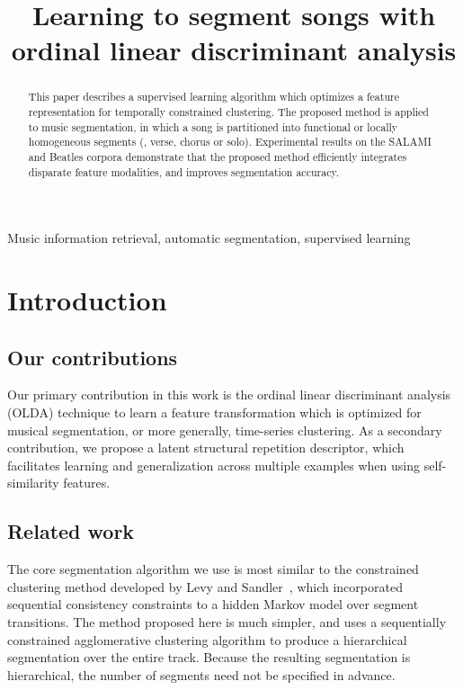 \documentclass{article}
\title{Learning to segment songs with ordinal linear discriminant analysis}
\begin{document}
%
\maketitle
%
\begin{abstract}
This paper describes a supervised learning algorithm which optimizes a feature representation for temporally constrained clustering. 
The proposed method is applied to music segmentation, in which a song is partitioned into functional or
locally homogeneous segments (\eg, verse, chorus or solo).  Experimental results on the SALAMI and Beatles corpora demonstrate
that the proposed method efficiently integrates disparate feature modalities, and improves segmentation accuracy.
\end{abstract}
%
\begin{keywords}
Music information retrieval, automatic segmentation, supervised learning
\end{keywords}
%
\section{Introduction}
\label{sec:intro}

\subsection{Our contributions}
Our primary contribution in this work is the ordinal linear discriminant analysis (OLDA) technique to learn a 
feature transformation which is optimized for musical segmentation, or more generally, time-series clustering.
As a secondary contribution, we propose a latent structural repetition descriptor, which facilitates learning and
generalization across multiple examples when using self-similarity features.

\subsection{Related work}
\label{sec:related}

The core segmentation algorithm we use is most similar to the constrained clustering method developed by Levy and
Sandler~\cite{levy2008structural}, which incorporated sequential consistency constraints to a hidden Markov model over
segment transitions. The method proposed here is much simpler, and uses a sequentially constrained agglomerative
clustering algorithm to produce a hierarchical segmentation over the entire track.  Because the
resulting segmentation is hierarchical, the number of segments need not be specified in advance.
\end{document}
